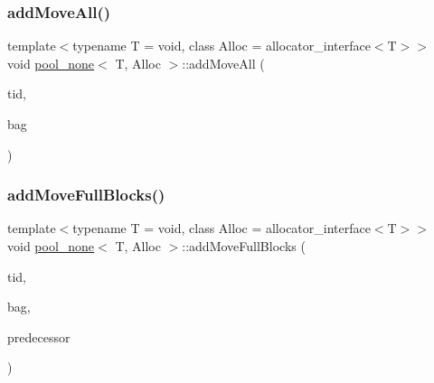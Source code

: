 \subsubsection{\texorpdfstring{add\+Move\+All()}{addMoveAll()}}
{\footnotesize\ttfamily template$<$typename T  = void, class Alloc  = allocator\+\_\+interface$<$\+T$>$$>$ \\
void \hyperlink{classpool__none}{pool\+\_\+none}$<$ T, Alloc $>$\+::add\+Move\+All (\begin{DoxyParamCaption}\item[{const int}]{tid,  }\item[{\hyperlink{classblockbag}{blockbag}$<$ T $>$ $\ast$}]{bag }\end{DoxyParamCaption})\hspace{0.3cm}{\ttfamily [inline]}}

\mbox{\label{classpool__none_a1970af5c93f95a63b0aaf6a85cf68f11}} 
\subsubsection{\texorpdfstring{add\+Move\+Full\+Blocks()}{addMoveFullBlocks()}\hspace{0.1cm}{\footnotesize\ttfamily [1/2]}}
{\footnotesize\ttfamily template$<$typename T  = void, class Alloc  = allocator\+\_\+interface$<$\+T$>$$>$ \\
void \hyperlink{classpool__none}{pool\+\_\+none}$<$ T, Alloc $>$\+::add\+Move\+Full\+Blocks (\begin{DoxyParamCaption}\item[{const int}]{tid,  }\item[{\hyperlink{classblockbag}{blockbag}$<$ T $>$ $\ast$}]{bag,  }\item[{\hyperlink{classblock}{block}$<$ T $>$ $\ast$const}]{predecessor }\end{DoxyParamCaption})\hspace{0.3cm}{\ttfamily [inline]}}

\mbox{\label{classpool__none_a0769e6af03c60e9148ccf91a2b034bbe}} 
